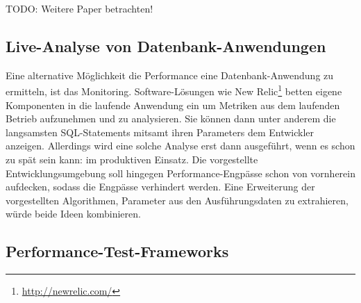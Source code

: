 TODO: Weitere Paper betrachten!

\subsection{Live-Analyse von Datenbank-Anwendungen}
Eine alternative Möglichkeit die Performance eine Datenbank-Anwendung zu ermitteln, ist das Monitoring.
Software-Lösungen wie New Relic\footnote{\url{http://newrelic.com/}} betten eigene Komponenten in die laufende Anwendung ein um Metriken aus dem laufenden Betrieb aufzunehmen und zu analysieren.
Sie können dann unter anderem die langsamsten SQL-Statements mitsamt ihren Parameters dem Entwickler anzeigen.
Allerdings wird eine solche Analyse erst dann ausgeführt, wenn es schon zu spät sein kann: im produktiven Einsatz.
Die vorgestellte Entwicklungsumgebung soll hingegen Performance-Engpässe schon von vornherein aufdecken, sodass die Engpässe verhindert werden.
Eine Erweiterung der vorgestellten Algorithmen, Parameter aus den Ausführungsdaten zu extrahieren, würde beide Ideen kombinieren.

\subsection{Performance-Test-Frameworks}
